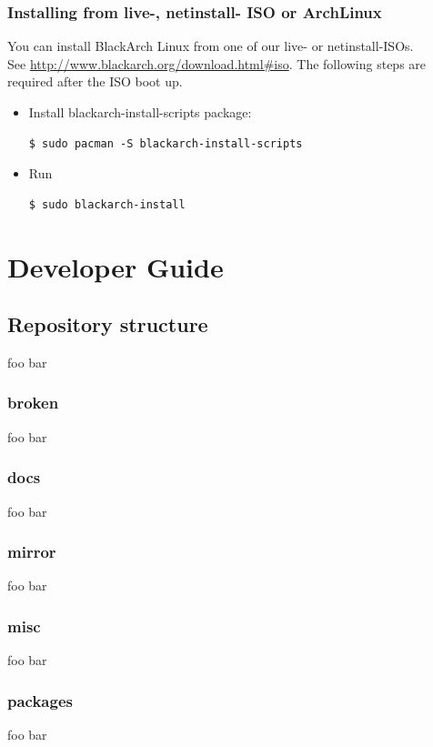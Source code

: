 \documentclass[a4paper, oneside, 11pt]{book}
\begin{document}
\subsection{Installing from live-, netinstall- ISO or ArchLinux}
You can install BlackArch Linux from one of our live- or netinstall-ISOs.\\See
\url{http://www.blackarch.org/download.html#iso}. The following steps are
required after the ISO boot up.
\begin{itemize}
\item Install blackarch-install-scripts package:
{\small
\color{gray}
\begin{verbatim}
$ sudo pacman -S blackarch-install-scripts
\end{verbatim}
}
\item Run
{\small
\color{gray}
\begin{verbatim}
$ sudo blackarch-install
\end{verbatim}
}
\end{itemize}


\chapter{Developer Guide}

\section{Repository structure}
foo bar

\subsection{broken}
foo bar

\subsection{docs}
foo bar

\subsection{mirror}
foo bar

\subsection{misc}
foo bar

\subsection{packages}
foo bar
\end{document}
